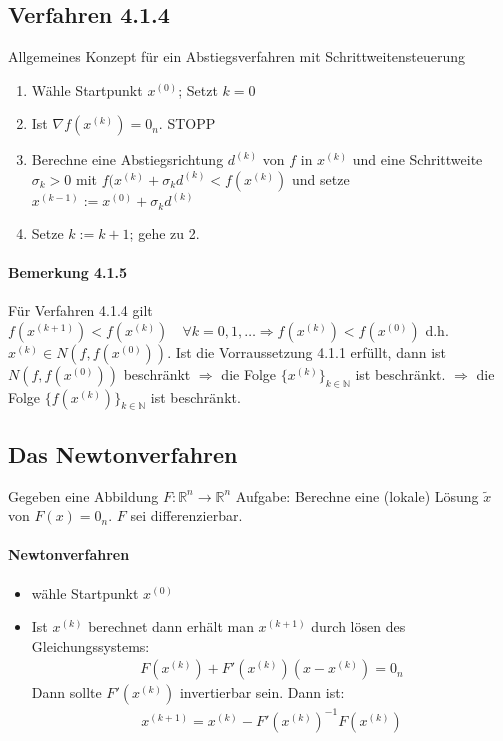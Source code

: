 \documentclass[ngerman,halfparskip]{scrartcl}
\theoremstyle{definition}
\def\R{\mathbb R}
\begin{document}
\subsection*{Verfahren 4.1.4} Allgemeines Konzept für ein Abstiegsverfahren mit Schrittweitensteuerung
\begin{enumerate}
\item Wähle Startpunkt $x^{(0)}$; Setzt $k=0$
\item Ist $\nabla f (x^{(k)})=0_n$. STOPP
\item Berechne eine Abstiegsrichtung $d^{(k)}$ von $f$ in $x^{(k)}$ und eine Schrittweite $\sigma_k>0$ mit $f(x^{(k)}+\sigma_kd^{(k)}<f(x^{(k)})$ und setze $x^{(k-1)}:=x^{(0)}+\sigma_kd^{(k)}$
\item Setze $k:=k+1$; gehe zu 2.
\end{enumerate}

\paragraph*{Bemerkung 4.1.5} Für Verfahren 4.1.4 gilt $f(x^{(k+1)})<f(x^{(k)})\quad \forall k=0,1,\ldots \Rightarrow f(x^{(k)})<f(x^{(0)})$ d.h. $x^{(k)}\in N(f,f(x^{(0)}))$.
Ist die Vorraussetzung 4.1.1 erfüllt, dann ist $N(f,f(x^{(0)}))$ beschränkt $\Rightarrow$ die Folge $\{x^{(k)}\}_{k\in\mathbb N}$ ist beschränkt. $\Rightarrow$ die Folge $\{f(x^{(k)})\}_{k\in\mathbb N}$ ist beschränkt. 
\subsection*{Das Newtonverfahren}
Gegeben eine Abbildung $F:\R^n\rightarrow\R^n$ Aufgabe: Berechne eine (lokale) Lösung $\tilde x$ von $F(x)=0_n$. $F$ sei differenzierbar.
\paragraph{Newtonverfahren}
\begin{itemize}
\item wähle Startpunkt $x^{(0)}$
\item Ist $x^{(k)}$ berechnet dann erhält man $x^{(k+1)}$ durch lösen des Gleichungssystems:
\begin{gather*}\tag{4.3.1}
F(x^{(k)})+F'(x^{(k)})(x-x^{(k)})=0_n
\end{gather*}
Dann sollte $F'(x^{(k)})$ invertierbar sein. Dann ist:
\begin{gather*}\tag{4.3.2}
x^{(k+1)}=x^{(k)}-F'(x^{(k)})^{-1}F(x^{(k)})
\end{gather*}
\end{itemize}
\end{document}
